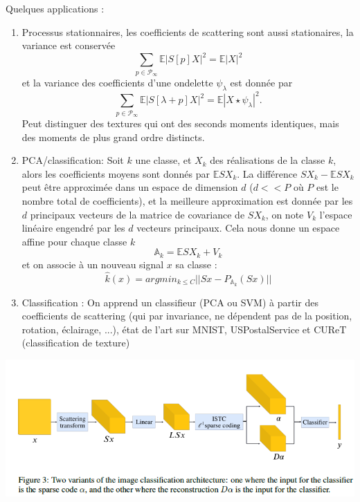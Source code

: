 \documentclass[11pt]{article} %
\begin{document}
Quelques applications :
\begin{enumerate}
	\item Processus stationnaires, les coefficients de scattering sont aussi stationaires, la variance est conservée
		\begin{equation}
			\sum_{p\in\mathcal{P}_\infty} \mathbb{E}|S[p]X|^2 = \mathbb{E}|X|^2
		\end{equation}
		et la variance des coefficients d'une ondelette $\psi_\lambda$ est donnée par
		\begin{equation}
			\sum_{p\in\mathcal{P}_\infty }\mathbb{E}|S[\lambda + p]X|^2 = \mathbb{E}|X\star \psi_\lambda|^2.
		\end{equation}
		Peut distinguer des textures qui ont des seconds moments identiques, mais des moments de plus grand ordre distincts.
	\item PCA/classification: Soit $k$ une classe, et $X_k$ des réalisations de la classe $k$, alors les coefficients moyens sont donnés par $\mathbb{E} SX_k$. La différence $SX_k - \mathbb{E}SX_k$ peut être approximée dans un espace de dimension $d$ ($d<<P$ où $P$ est le nombre total de coefficients), et la meilleure approximation est donnée par les $d$ principaux vecteurs de la matrice de covariance de $SX_k$, on note $V_k$ l'espace linéaire engendré par les $d$ vecteurs principaux. Cela nous donne un espace affine pour chaque classe $k$
		\begin{equation}
			\mathbb{A}_k = \mathbb{E}SX_k + V_k
		\end{equation}
		et on associe à un nouveau signal $x$ sa classe :
		\begin{equation}
			\hat{k}(x) = argmin_{k\leq C}||Sx - P_{\mathbb{A}_k}(Sx)||
		\end{equation}
	\item Classification : On apprend un classifieur (PCA ou SVM) à partir des coefficients de scattering (qui par invariance, ne dépendent pas de la position, rotation, éclairage, ...), état de l'art sur MNIST, USPostalService et CUReT (classification de texture)
\end{enumerate}
\includegraphics[width=\textwidth]{scat_clas}
\end{document}
